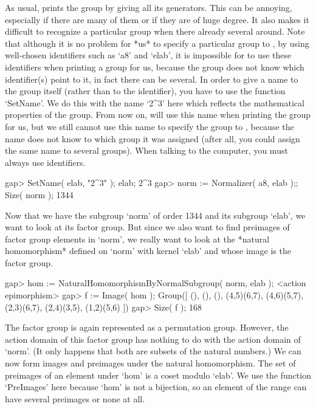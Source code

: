 As usual, {\GAP} prints the group by giving  all its generators. This can
be annoying, especially if there are many of them or  if they are of huge
degree. It also makes  it difficult to recognize  a particular group when
there already several  around. Note  that  although it is no  problem for
*us* to    specify a particular  group to   {\GAP}, by  using well-chosen
identifiers such as `a8'  and `elab', it is  impossible for {\GAP} to use
these identifiers when printing  a group for us,  because the group  does
not know which identifier(s) point  to it, in fact  there can be several.
In order to    give a name  to  the  group  itself (rather   than  to the
identifier), you have to use the function `SetName'.  We do this with the
name `2^3' here which reflects  the mathematical properties of the group.
From now on,  {\GAP} will use  this name when  printing the group for us,
but we still cannot use this name to specify the group to {\GAP}, because
the name does  not know to which group   it was assigned (after  all, you
could assign the   same  name to several  groups).  When  talking  to the
computer, you must always use identifiers.

\beginexample
gap> SetName( elab, "2^3" ); elab;
2^3
gap> norm := Normalizer( a8, elab );; Size( norm );
1344
\endexample

Now that  we  have the subgroup `norm'   of order 1344   and its subgroup
`elab', we want to look  at its factor  group. But since  we also want to
find preimages of factor group elements in `norm', we really want to look
at the  *natural homomorphism* defined on  `norm' with  kernel `elab' and
whose image is the factor group.

\beginexample
gap> hom := NaturalHomomorphismByNormalSubgroup( norm, elab );
<action epimorphism>
gap> f := Image( hom );
Group([ (), (), (), (4,5)(6,7), (4,6)(5,7), (2,3)(6,7), (2,4)(3,5), 
  (1,2)(5,6) ])
gap> Size( f );
168
\endexample

The factor group  is again represented as  a  permutation group. However,
the action domain  of this factor  group has  nothing  to do with  the
action domain of `norm'. (It only happens that both are subsets of the
natural numbers.) We can now form  images and preimages under the natural
homomorphism. The set of  preimages of an element under  `hom' is a coset
modulo `elab'. We use the function  `PreImages' here because `hom' is not
a bijection, so an  element of the range can   have several preimages  or
none at all.

